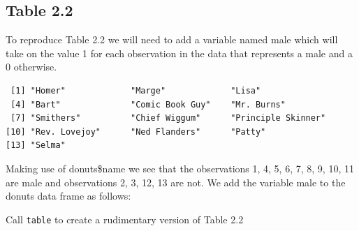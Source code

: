 \documentclass[]{book}
\newenvironment{Shaded}{\begin{snugshade}}{\end{snugshade}}
\newcommand{\CommentTok}[1]{\textcolor[rgb]{0.56,0.35,0.01}{\textit{#1}}}
\newcommand{\DecValTok}[1]{\textcolor[rgb]{0.00,0.00,0.81}{#1}}
\newcommand{\KeywordTok}[1]{\textcolor[rgb]{0.13,0.29,0.53}{\textbf{#1}}}
\newcommand{\NormalTok}[1]{#1}
\newcommand{\OperatorTok}[1]{\textcolor[rgb]{0.81,0.36,0.00}{\textbf{#1}}}
\newcommand{\StringTok}[1]{\textcolor[rgb]{0.31,0.60,0.02}{#1}}
\begin{document}
\hypertarget{table-2.2}{%
\subsection{Table 2.2}\label{table-2.2}}

To reproduce Table 2.2 we will need to add a variable named male which will take on the value 1 for each observation in the data that represents a male and a 0 otherwise.

\begin{Shaded}
\end{Shaded}

\begin{verbatim}
 [1] "Homer"             "Marge"             "Lisa"             
 [4] "Bart"              "Comic Book Guy"    "Mr. Burns"        
 [7] "Smithers"          "Chief Wiggum"      "Principle Skinner"
[10] "Rev. Lovejoy"      "Ned Flanders"      "Patty"            
[13] "Selma"            
\end{verbatim}

Making use of donuts\$name we see that the observations 1, 4, 5, 6, 7, 8, 9, 10, 11 are male and observations 2, 3, 12, 13 are not. We add the variable male to the donuts data frame as follows:

\begin{Shaded}
\end{Shaded}

Call \texttt{table} to create a rudimentary version of Table 2.2

\begin{Shaded}
\end{Shaded}
\end{document}
